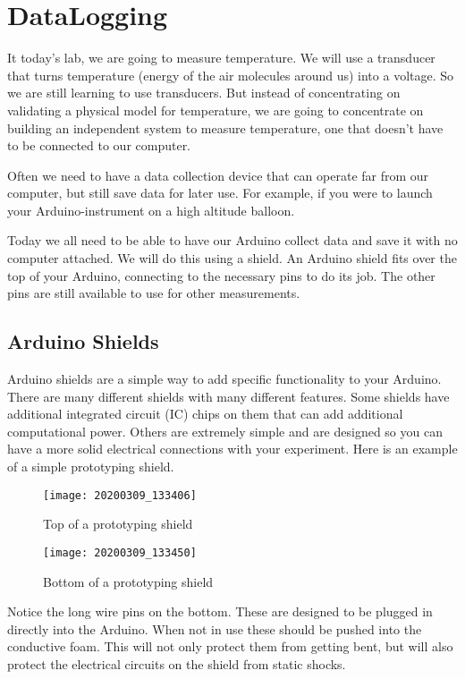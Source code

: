 \chapter{DataLogging}
It today's lab, we are going to measure temperature. We will use a transducer that turns temperature (energy of the air molecules around us) into a voltage. So we are still learning to use transducers. But instead of concentrating on validating a physical model for temperature, we are going to concentrate on building an independent system to measure temperature, one that doesn't have to be connected to our computer.

Often we need to have a data collection device that can operate far from our computer, but still save data for later use. For example, if you were to launch your Arduino-instrument on a high altitude balloon.

Today we all need to be able to have our Arduino collect data and save it with no computer attached. We will do this using a shield. An Arduino shield fits over the top of your Arduino, connecting to the necessary pins to do its job. The other pins are still available to use for other measurements. 

\section{Arduino Shields}
	Arduino shields are a simple way to add specific functionality to your Arduino. There are many different shields with many different features. Some shields have additional integrated circuit (IC) chips on them that can add additional computational power.  Others are extremely simple and are designed so you can have a more solid electrical connections with your experiment.  Here is an example of a simple prototyping shield.
	\begin{figure}[h!] 
		\centering
		\caption{Top of a prototyping shield}
		\texttt{[image: 20200309\_133406]}
	\end{figure}
	\begin{figure}[h!] 
		\centering
		\caption{Bottom of a prototyping shield}
		\texttt{[image: 20200309\_133450]}
	\end{figure}
	
	Notice the long wire pins on the bottom. These are designed to be plugged in directly into the Arduino. When not in use these should be pushed into the conductive foam. This will not only protect them from getting bent, but will also protect the electrical circuits on the shield from static shocks.
	

